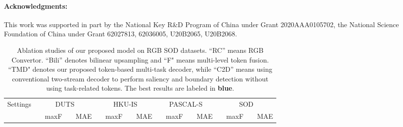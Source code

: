 \documentclass[10pt,twocolumn,letterpaper]{article}
\def\blu#1{\textbf{\color{blue} #1}} \def\red#1{\textbf{\color{red}\underline{#1}}}
\begin{document}
\vspace{-4mm}
\paragraph{Acknowledgments:}
This work was supported in part by the National Key R\&D Program of China under Grant 2020AAA0105702, the National Science Foundation of China under Grant 62027813, 62036005, U20B2065, U20B2068.


{\small


}

\clearpage

\begin{table*}[!ht]
\centering
\footnotesize
\renewcommand{\arraystretch}{1.1}
\renewcommand{\tabcolsep}{1.3mm}
\caption{Ablation studies of our proposed model on RGB SOD datasets. ``RC'' means RGB Convertor.  ``Bili'' denotes bilinear upsampling and ``F" means multi-level token fusion. ``TMD" denotes our proposed token-based multi-task decoder, while ``C2D'' means using conventional two-stream decoder to perform saliency and boundary detection without using task-related tokens. The best results are labeled in \blu{blue}.
}
\begin{tabular}{l|l|cccc|cccc|cccc|cccc}
\hline
\multicolumn{2}{l|}{\multirow{2}{*}{Settings}} & \multicolumn{4}{c|}{DUTS \cite{wang2017duts}} & \multicolumn{4}{c|}{HKU-IS \cite{li2015HKUIS}} & \multicolumn{4}{c|}{PASCAL-S \cite{li2014PASCALS}} & \multicolumn{4}{c}{SOD \cite{movahedi2010SOD}}\\
\multicolumn{2}{l|}{} & \multicolumn{1}{l}{} & \multicolumn{1}{l}{maxF} & \multicolumn{1}{l}{} & \multicolumn{1}{l|}{MAE}
                      & \multicolumn{1}{l}{} & \multicolumn{1}{l}{maxF} & \multicolumn{1}{l}{} & \multicolumn{1}{l|}{MAE}
                      & \multicolumn{1}{l}{} & \multicolumn{1}{l}{maxF} & \multicolumn{1}{l}{} & \multicolumn{1}{l|}{MAE}
                      & \multicolumn{1}{l}{} & \multicolumn{1}{l}{maxF} & \multicolumn{1}{l}{} & \multicolumn{1}{l}{MAE}

  \\ \hline


\end{tabular}
\end{table*}
\end{document}
